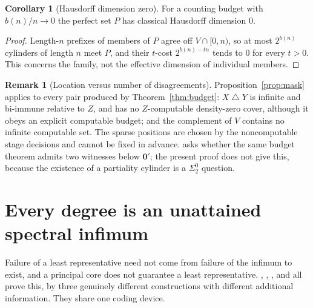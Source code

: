 \documentclass[11pt,letterpaper]{article}
\theoremstyle{definition}
\newtheorem{corollary}[definition]{Corollary}
\newtheorem{remark}[definition]{Remark}
\numberwithin{equation}{section}
\newcommand{\sd}{\mathbin{\triangle}}
\newcommand{\zero}{\mathbf 0}
\newcommand{\src}[1]{\leavevmode{\sffamily\footnotesize\color{Steel}[#1]}}
\newcommand{\rep}[1]{\leavevmode{\sffamily\small\color{Steel}R#1}}
\begin{document}
\begin{corollary}[Hausdorff dimension zero]\label{cor:dimension}\src{R6}
For a counting budget with $b(n)/n\to0$ the perfect set $P$ has classical Hausdorff dimension $0$.
\end{corollary}
\begin{proof}
Length-$n$ prefixes of members of $P$ agree off $V\cap[0,n)$, so at most $2^{b(n)}$ cylinders of length $n$ meet $P$, and their $t$-cost $2^{b(n)-tn}$ tends to $0$ for every $t>0$. This concerns the family, not the effective dimension of individual members.
\end{proof}

\begin{remark}[Location versus number of disagreements]\label{rem:location}
Proposition~\ref{prop:mask} applies to every pair produced by Theorem~\ref{thm:budget}: $X\sd Y$ is infinite and bi-immune relative to $Z$, and has no $Z$-computable density-zero cover, although it obeys an explicit computable budget; and the complement of $V$ contains no infinite computable set. The sparse positions are chosen by the noncomputable stage decisions and cannot be fixed in advance. \rep6 asks whether the same budget theorem admits two witnesses below $\zero'$; the present proof does not give this, because the existence of a partiality cylinder is a $\Sigma^0_2$ question.
\end{remark}

\section{Every degree is an unattained spectral infimum}\label{sec:infimum}
Failure of a least representative need not come from failure of the infimum to exist, and a principal core does not guarantee a least representative. \rep2, \rep5, \rep7, \rep8 and \rep9 all prove this, by three genuinely different constructions with different additional information. They share one coding device.
\end{document}
